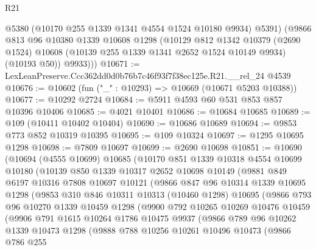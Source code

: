 \begin{lexlean}{R21}
\begin{coremodule}
          @5380
          (@10170 @255 @1339 @1341 @4554 @1524 @10180 @9934)
          @5391)
        (@9866
          @813
          @96
          @10380
          @1339
          @10608
          @1298
          (@10129
            @812
            @1342
            @10379
            (@2690 @1524)
            @10608
            (@10139 @255 @1339 @1341 @2652 @1524 @10149 @9934)
            (@10193 @50))
          @9933)))
@10671 := LexLeanPreserve.Ccc362dd0d0b76b7c46f93f7f38ec125e.R21.__rel_24 @4539
@10676 := @10602 (fun ("_" : @10293) => @10669 (@10671 @5203 @10388))
@10677 := @10292 @2724
@10684 := @5911 @4593 @60 @531 @853 @857 @10396 @10406
@10685 := @4021 @10401
@10686 := @10684 @10685
@10689 := @109 (@10411 @10402 @10404)
@10690 := @10686 @10689
@10694 := @9853 @773 @852 @10319 @10395
@10695 := @109 @10324
@10697 := @1295 @10695 @1298
@10698 := @7809 @10697
@10699 := @2690 @10698
@10851 := @10690
    (@10694
      (@4555 @10699)
      @10685
      (@10170
        @851
        @1339
        @10318
        @4554
        @10699
        @10180
        (@10139
          @850
          @1339
          @10317
          @2652
          @10698
          @10149
          (@9881
            @849
            @6197
            @10316
            @7808
            @10697
            @10121
            (@9866
              @847
              @96
              @10314
              @1339
              @10695
              @1298
              (@9853
                @310
                @846
                @10311
                @10313
                (@10460 @1298)
                @10695
                (@9866
                  @793
                  @96
                  @10270
                  @1339
                  @10459
                  @1298
                  (@9900
                    @792
                    @10265
                    @10269
                    @10476
                    @10459
                    (@9906
                      @791
                      @1615
                      @10264
                      @1786
                      @10475
                      @9937
                      (@9866
                        @789
                        @96
                        @10262
                        @1339
                        @10473
                        @1298
                        (@9888
                          @788
                          @10256
                          @10261
                          @10496
                          @10473
                          (@9866
                            @786
                            @255

\end{coremodule}
\end{lexlean}
